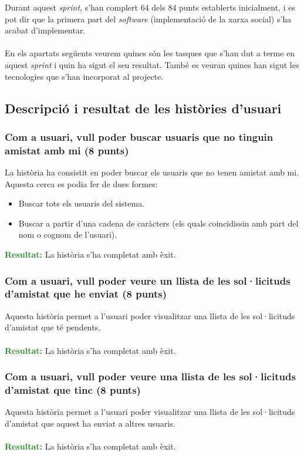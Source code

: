 \documentclass[11pt,catalan,listoffigures,listoftables]{tfgetsinf}
\begin{document}
Durant aquest \textit{sprint}, s'han complert 64 dels 84 punts establerts inicialment, i es pot dir que la primera part del \textit{software} (implementació de la xarxa social) s'ha acabat d'implementar.\\ \\
En els apartats següents veurem quines són les tasques que s'han dut a terme en aquest \textit{sprint} i quin ha sigut el seu resultat. També es veuran quines han sigut les tecnologies que s'han incorporat al projecte.

\subsection{Descripció i resultat de les històries d'usuari}

\subsubsection{Com a usuari, vull poder buscar usuaris que no tinguin amistat amb mi (8 punts)}

La història ha consistit en poder buscar els usuaris que no tenen amistat amb mi. Aquesta cerca es podia fer de dues formes:
\begin{itemize}
\item Buscar tots els usuaris del sistema.
\item Buscar a partir d'una cadena de caràcters (els quals coincidissin amb part del nom o cognom de l'usuari).
\end{itemize}
\textcolor{forestgreen}{\textbf{Resultat:}} La història s'ha completat amb èxit.

\subsubsection{Com a usuari, vull poder veure un llista de les sol·licituds d'amistat que he enviat (8 punts)}
Aquesta història permet a l'usuari poder visualitzar una llista de les sol·licituds d'amistat que té pendents.\\ \\
\textcolor{forestgreen}{\textbf{Resultat:}} La història s'ha completat amb èxit.

\subsubsection{Com a usuari, vull poder veure una llista de les sol·licituds d'amistat que tinc (8 punts)}
Aquesta història permet a l'usuari poder visualitzar una llista de les sol·licituds d'amistat que aquest ha enviat a altres usuaris.\\ \\
\textcolor{forestgreen}{\textbf{Resultat:}} La història s'ha completat amb èxit.
\end{document}
